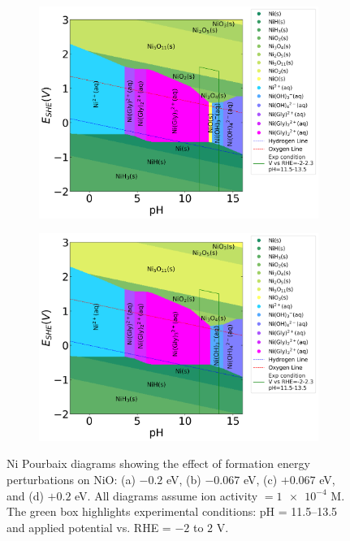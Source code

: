 \documentclass[journal=jacsat,manuscript=article]{achemso}
\begin{document}
\begin{figure}[htbp]
\begin{subfigure}[b]{0.45\textwidth}
    \end{subfigure}
    \begin{subfigure}[b]{0.45\textwidth}
        \subcaption{}\label{fig:Ni_noise_0.067}
        \includegraphics[width=\textwidth]{Figures/pourbaix_diagrams/Ni_gly_0.06666666666666665.png} 
    \end{subfigure}
    \begin{subfigure}[b]{0.45\textwidth}
        \subcaption{}\label{fig:Ni_noise_0.2}
        \includegraphics[width=\textwidth]{Figures/pourbaix_diagrams/Ni_gly_0.2.png} 
    \end{subfigure}
    
    \caption{Ni Pourbaix diagrams showing the effect of formation energy perturbations on NiO: (a) $-0.2$ eV, (b) $-0.067$ eV, (c) $+0.067$ eV, and (d) $+0.2$ eV. All diagrams assume ion activity $= \num{1e-4}$ M. The green box highlights experimental conditions: pH = 11.5–13.5 and applied potential vs. RHE = $-2$ to $2$ V.}
    \label{fig:Ni_Pourbaix_noise}
\end{figure}
\end{document}
